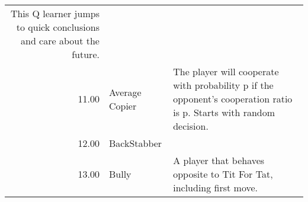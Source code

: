 \begin{tabular}{rll}
	This Q learner jumps to quick conclusions and care about the future.                                                                                                                                                                                                                                                                                                                                                                                                                                                                                                                                                                                                                                                                                                                                                                                                                                                                      \\
	11.00  & Average Copier              & The player will cooperate with probability p if the opponent's cooperation ratio is p.
	Starts with random decision.                                                                                                                                                                                                                                                                                                                                                                                                                                                                                                                                                                                                                                                                                                                                                                                                                                                                                                  \\
	12.00  & BackStabber                 &                                                                                                                                   \\
	13.00  & Bully                       & A player that behaves opposite to Tit For Tat, including first move.


\end{tabular}
